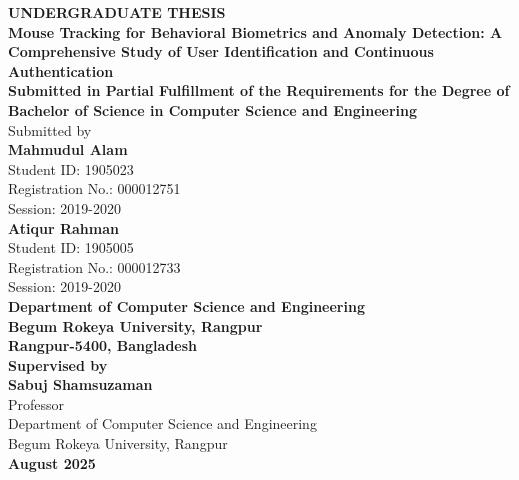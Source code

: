 \documentclass[
  11pt,
  a4paper,
]{article}
\author{}
\date{}
\begin{document}
\renewcommand*\contentsname{TABLE OF CONTENTS}
{
\setcounter{tocdepth}{2}
\tableofcontents
}
\newpage
\thispagestyle{empty}

\begin{center}
\vspace*{2cm}

\textbf{UNDERGRADUATE THESIS}\\[2cm]

{\LARGE \textbf{Mouse Tracking for Behavioral Biometrics and Anomaly Detection: A Comprehensive Study of User Identification and Continuous Authentication}}\\[2cm]

\textbf{Submitted in Partial Fulfillment of the Requirements for the Degree of}\\[0.5cm]
\textbf{Bachelor of Science in Computer Science and Engineering}\\[2cm]

Submitted by\\[1cm]
\textbf{Mahmudul Alam}\\
Student ID: 1905023\\
Registration No.: 000012751\\
Session: 2019-2020\\[1cm]

\textbf{Atiqur Rahman}\\
Student ID: 1905005\\
Registration No.: 000012733\\
Session: 2019-2020\\[2cm]

\textbf{Department of Computer Science and Engineering}\\
\textbf{Begum Rokeya University, Rangpur}\\
\textbf{Rangpur-5400, Bangladesh}\\[2cm]

\textbf{Supervised by}\\[0.5cm]
\textbf{Sabuj Shamsuzaman}\\
Professor\\
Department of Computer Science and Engineering\\
Begum Rokeya University, Rangpur\\[1.5cm]

\textbf{August 2025}

\vspace*{\fill}
\end{center}

\newpage
\end{document}
